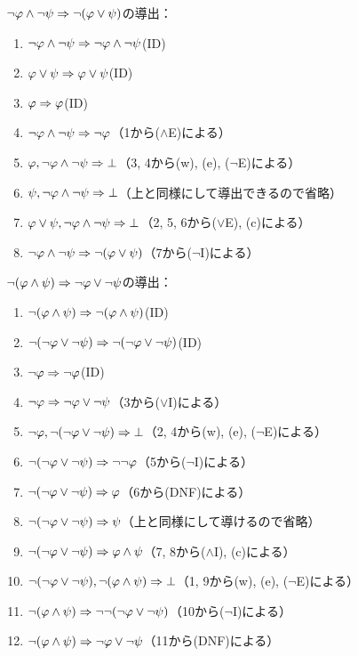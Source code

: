 \(\lnot \varphi \land \lnot \psi \sequent \lnot \paren{\varphi \lor \psi}\)の導出：
\begin{enumerate}
	\item \(\lnot \varphi \land \lnot \psi \Rightarrow \lnot \varphi \land \lnot \psi\)\quad (ID)
	\item \(\varphi \lor \psi \Rightarrow \varphi \lor \psi\)\quad (ID)
	\item \(\varphi \Rightarrow \varphi\)\quad (ID)
	\item \(\lnot \varphi \land \lnot \psi \Rightarrow \lnot \varphi\)\quad （1から(\(\land\)E)による）
	\item \(\varphi, \lnot \varphi \land \lnot \psi \Rightarrow \bot\)\quad （3, 4から(w), (e), (\(\lnot\)E)による）
	\item \(\psi, \lnot \varphi \land \lnot \psi \Rightarrow \bot\)\quad （上と同様にして導出できるので省略）
	\item \(\varphi \lor \psi, \lnot \varphi \land \lnot \psi \Rightarrow \bot\)\quad （2, 5, 6から(\(\lor\)E), (c)による）
	\item \(\lnot \varphi \land \lnot \psi \sequent \lnot \paren{\varphi \lor \psi}\)\quad （7から(\(\lnot\)I)による）
\end{enumerate}

\(\lnot \paren{\varphi \land \psi} \sequent \lnot \varphi \lor \lnot \psi\)の導出：
\begin{enumerate}
	\item \(\lnot \paren{\varphi \land \psi} \sequent \lnot \paren{\varphi \land \psi}\)\quad (ID)
	\item \(\lnot \paren{\lnot \varphi \lor \lnot \psi} \sequent \lnot \paren{\lnot \varphi \lor \lnot \psi}\)\quad (ID)
	\item \(\lnot \varphi \Rightarrow \lnot \varphi\)\quad (ID)
	\item \(\lnot \varphi \Rightarrow \lnot \varphi \lor \lnot \psi\)\quad （3から(\(\lor\)I)による）
	\item \(\lnot \varphi, \lnot \paren{\lnot \varphi \lor \lnot \psi} \sequent \bot\)\quad （2, 4から(w), (e), (\(\lnot\)E)による）
	\item \(\lnot \paren{\lnot \varphi \lor \lnot \psi} \sequent \lnot \lnot \varphi\)\quad （5から(\(\lnot\)I)による）
	\item \(\lnot \paren{\lnot \varphi \lor \lnot \psi} \sequent \varphi\)\quad （6から(DNF)による）
	\item \(\lnot \paren{\lnot \varphi \lor \lnot \psi} \sequent \psi\)\quad （上と同様にして導けるので省略）
	\item \(\lnot \paren{\lnot \varphi \lor \lnot \psi} \sequent \varphi \land \psi\)\quad （7, 8から(\(\land\)I), (c)による）
	\item \(\lnot \paren{\lnot \varphi \lor \lnot \psi}, \lnot \paren{\varphi \land \psi} \sequent \bot\)\quad （1, 9から(w), (e), (\(\lnot\)E)による）
	\item \(\lnot \paren{\varphi \land \psi} \sequent \lnot \lnot \paren{\lnot \varphi \lor \lnot \psi}\)\quad （10から(\(\lnot\)I)による）
	\item \(\lnot \paren{\varphi \land \psi} \sequent \lnot \varphi \lor \lnot \psi\)\quad （11から(DNF)による）
\end{enumerate}

